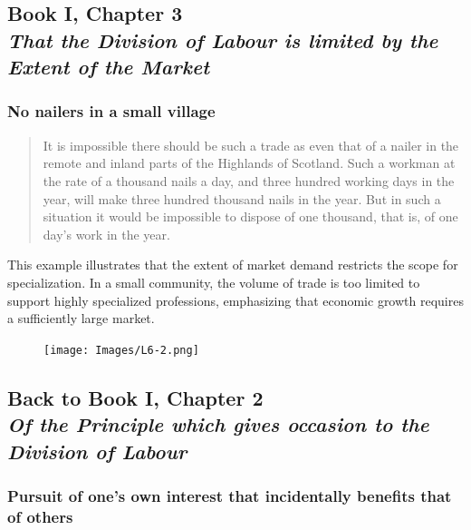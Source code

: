     \subsection[That the Division of Labour is limited by the Extent of the Market]{Book I, Chapter 3 \\
                \textit{That the Division of Labour is limited by the Extent of the Market}}

        \subsubsection{No nailers in a small village}

            \begin{quote}
                It is impossible there should be such a trade as even that of a nailer in the remote and inland parts of the Highlands of Scotland. Such a workman at the rate of a thousand nails a day, and three hundred working days in the year, will make three hundred thousand nails in the year. But in such a situation it would be impossible to dispose of one thousand, that is, of one day's work in the year.
            \end{quote}

            This example illustrates that the extent of market demand restricts the scope for specialization. In a small community, the volume of trade is too limited to support highly specialized professions, emphasizing that economic growth requires a sufficiently large market.

            \begin{figure}[h]
                \centering
                \texttt{[image: Images/L6-2.png]}
                \label{fig:L6-2}
            \end{figure}

    \subsection[Back to "Of the Principle which gives occasion to the Division of Labour"]{Back to Book I, Chapter 2 \\
                \textit{Of the Principle which gives occasion to the Division of Labour}}

        \subsubsection{Pursuit of one’s own interest that incidentally benefits that of others}

